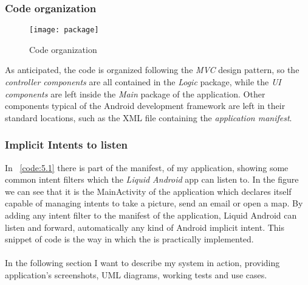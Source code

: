 \subsubsection{Code organization}
\begin{figure}[h]
	\centering
	\texttt{[image: package]}
	\caption{Code organization}
	\label{fig:5.1}
\end{figure}
As anticipated, the code is organized following the \textit{MVC} design pattern, so the \textit{controller components} are all contained in the \textit{Logic} package, while the \textit{UI components} are left inside the \textit{Main} package of the application. Other components typical of the Android development framework are left in their standard locations, such as the XML file containing the \textit{application manifest}.

\subsubsection{Implicit Intents to listen}

In \lstlistingname~\ref{code:5.1} there is part of the manifest, of my application, showing some common intent filters which the \textit{Liquid Android} app can listen to. In the figure we can see that it is the MainActivity of the application which declares itself capable of managing intents to take a picture, send an email or open a map. By adding any intent filter to the manifest of the application, Liquid Android can listen and forward, automatically any kind of Android implicit intent. This snippet of code is the way in which the  is practically implemented.\\\\
In the following section I want to describe my system in action, providing application's screenshots, UML diagrams, working tests and use cases.
